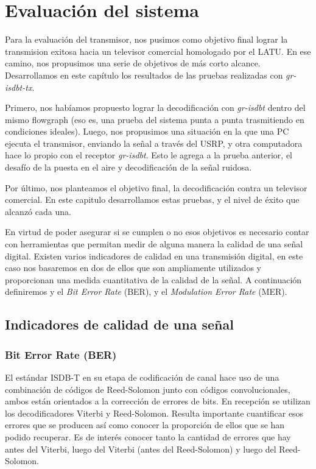 \chapter{Evaluación del sistema}

Para la evaluación del transmisor, nos pusimos como objetivo final lograr la transmision exitosa hacia un televisor comercial homologado por el LATU. En ese camino, nos propusimos una serie de objetivos de más corto alcance. Desarrollamos en este capítulo los resultados de las pruebas realizadas con \textit{gr-isdbt-tx}.

Primero, nos habíamos propuesto lograr la decodificación con \textit{gr-isdbt} dentro del mismo flowgraph (eso es, una prueba del sistema punta a punta trasmitiendo en condiciones ideales). Luego, nos propusimos una situación en la que una PC ejecuta el transmisor, enviando la señal a través del USRP, y otra computadora hace lo propio con el receptor \textit{gr-isdbt}. Esto le agrega a la prueba anterior, el desafío de la puesta en el aire y decodificación de la señal ruidosa.

Por último, nos planteamos el objetivo final, la decodificación contra un televisor comercial. En este capitulo desarrollamos estas pruebas, y el nivel de éxito que alcanzó cada una.

En virtud de poder asegurar si se cumplen o no esos objetivos es necesario contar con herramientas que permitan medir de alguna manera la calidad de una señal digital. Existen varios indicadores de calidad en una transmisión digital, en este caso nos basaremos en dos de ellos que son ampliamente utilizados y proporcionan una medida cuantitativa de la calidad de la señal. A continuación definiremos y el \textit{Bit Error Rate} (BER), y el \textit{Modulation Error Rate} (MER).

\section{Indicadores de calidad de una señal}
\subsection{Bit Error Rate (BER)}
El estándar ISDB-T en su etapa de codificación de canal hace uso de una combinación de códigos de Reed-Solomon junto con códigos convolucionales, ambos están orientados a la corrección de errores de bits. En recepción se utilizan los decodificadores Viterbi y Reed-Solomon. Resulta importante cuantificar esos errores que se producen así como conocer la proporción de ellos que se han podido recuperar. Es de interés conocer tanto la cantidad de errores que hay antes del Viterbi, luego del Viterbi (antes del Reed-Solomon) y luego del Reed-Solomon.

